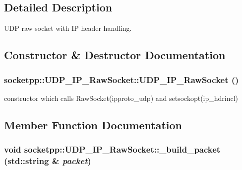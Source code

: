 \subsection{Detailed Description}
UDP raw socket with IP header handling. 

\subsection{Constructor \& Destructor Documentation}
\hypertarget{classsocketpp_1_1UDP__IP__RawSocket_90e90d941b64d234c231ca543fe8745a}{
\subsubsection[{UDP\_\-IP\_\-RawSocket}]{\setlength{\rightskip}{0pt plus 5cm}socketpp::UDP\_\-IP\_\-RawSocket::UDP\_\-IP\_\-RawSocket ()}}
\label{classsocketpp_1_1UDP__IP__RawSocket_90e90d941b64d234c231ca543fe8745a}


constructor which calls RawSocket(ipproto\_\-udp) and setsockopt(ip\_\-hdrincl) 



\subsection{Member Function Documentation}
\hypertarget{classsocketpp_1_1UDP__IP__RawSocket_16035f1b701b898f0e4de44a9ac8bbb3}{
\subsubsection[{\_\-build\_\-packet}]{\setlength{\rightskip}{0pt plus 5cm}void socketpp::UDP\_\-IP\_\-RawSocket::\_\-build\_\-packet (std::string \& {\em packet})}}
\label{classsocketpp_1_1UDP__IP__RawSocket_16035f1b701b898f0e4de44a9ac8bbb3}




